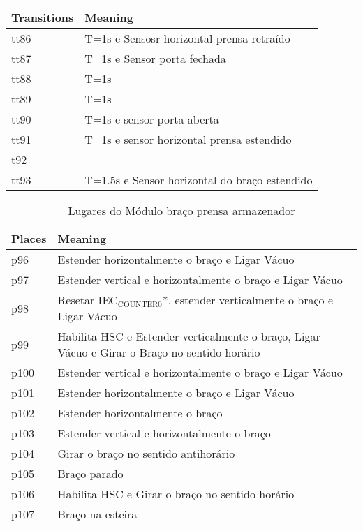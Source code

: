 \begin{center}
\begin{tabular}{ll}
Transitions & Meaning\\
\hline
tt86 & T=1s e Sensosr horizontal prensa retraído\\
tt87 & T=1s e Sensor porta fechada\\
tt88 & T=1s\\
tt89 & T=1s\\
tt90 & T=1s e sensor porta aberta\\
tt91 & T=1s e sensor horizontal prensa estendido\\
t92 & \\
tt93 & T=1.5s e Sensor horizontal do braço estendido\\
\end{tabular}
\end{center}
\begin{table}[htbp]
\caption{Lugares do Módulo braço prensa armazenador}
\centering
\begin{tabular}{ll}
Places & Meaning\\
\hline
p96 & Estender horizontalmente o braço e Ligar Vácuo\\
p97 & Estender vertical e horizontalmente o braço e Ligar Vácuo\\
p98 & Resetar IEC\(_{\text{COUNTER0}}\)*, estender verticalmente o braço e Ligar Vácuo\\
p99 & Habilita HSC e Estender verticalmente o braço, Ligar Vácuo e Girar o Braço no sentido horário\\
p100 & Estender vertical e horizontalmente o braço e Ligar Vácuo\\
p101 & Estender horizontalmente o braço e Ligar Vácuo\\
p102 & Estender horizontalmente o braço\\
p103 & Estender vertical e horizontalmente o braço\\
p104 & Girar o braço no sentido antihorário\\
p105 & Braço parado\\
p106 & Habilita HSC e Girar o braço no sentido horário\\
p107 & Braço na esteira\\
\end{tabular}
\end{table}

